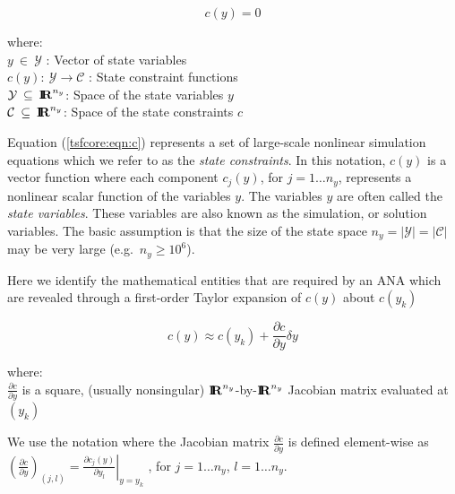 {\bsinglespace
\begin{equation}
c(y)  = 0
\label{tsfcore:eqn:c}
\end{equation}
\begin{tabbing}
\hspace{4ex}where:\hspace{5ex}\= \\
\>	$y \:\in\:\mathcal{Y}$ : Vector of state variables \\
\>	$c(y) : \:\mathcal{Y} \rightarrow \mathcal{C}$ : State constraint functions \\
\>	$\mathcal{Y} \:\subseteq\:\mbox{\textbf{I}}\hspace{-0.6ex}\mbox{\textbf{R}}^{n_y}$: Space of the state variables $y$ \\
\>	$\mathcal{C} \:\subseteq\:\mbox{\textbf{I}}\hspace{-0.6ex}\mbox{\textbf{R}}^{n_y}$: Space of the state constraints $c$
\end{tabbing}
\esinglespace}

Equation (\ref{tsfcore:eqn:c}) represents a set of large-scale
nonlinear simulation equations which we refer to as the \textit{state
constraints}.  In this notation, $c(y)$ is a vector function where
each component $c_j(y)$, for $j = 1 \ldots n_y$, represents a
nonlinear scalar function of the variables $y$.  The variables $y$ are
often called the {\em state variables}.  These variables are also
known as the simulation, or solution variables.  The basic assumption
is that the size of the state space $n_y = |\mathcal{Y}| =
|\mathcal{C}|$ may be very large (e.g.~$n_y \ge 10^{6}$).

Here we identify the mathematical entities that are required by an ANA
which are revealed through a first-order Taylor expansion of $c(y)$
about $c(y_k)$

\begin{equation}
c(y) \approx c(y_k) + \frac{\partial c}{\partial y} \delta y
\label{tsfcore:eqn:c_taylor}
\end{equation}
\begin{tabbing}
\hspace{4ex}where:\hspace{5ex}\= \\
\>	$\frac{\partial c}{\partial y}$ is a square, (usually nonsingular) $\mbox{\textbf{I}}\hspace{-0.6ex}\mbox{\textbf{R}}^{n_y}$-by-$\mbox{\textbf{I}}\hspace{-0.6ex}\mbox{\textbf{R}}^{n_y}$
    Jacobian matrix evaluated at $(y_k)$
\end{tabbing}

We use the notation where the Jacobian matrix $\frac{\partial
c}{\partial y}$ is defined element-wise as $\left( \frac{\partial
c}{\partial y} \right)_{(j,l)} = \left.\frac{\partial c_j(y)}{\partial y_l}\right|_{y=y_k}$ ,
for $j = 1 \ldots n_y$, $l = 1 \ldots n_y$.

